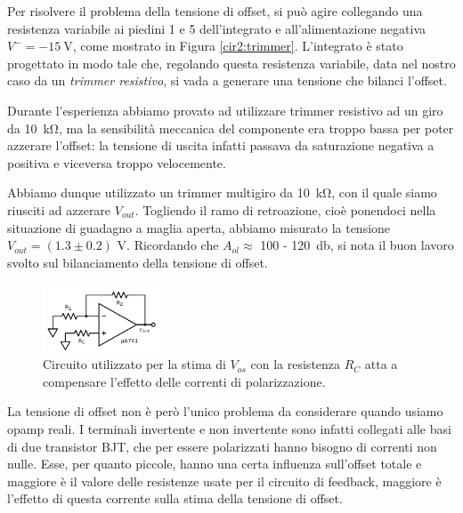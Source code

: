
Per risolvere il problema della tensione di offset, si può agire collegando una resistenza variabile ai piedini 1 e 5 dell'integrato e all'alimentazione negativa $V^- = \SI{-15}{\volt}$, come mostrato in Figura \ref{cir2:trimmer}.
L'integrato è stato progettato in modo tale che, regolando questa resistenza variabile, data nel nostro caso da un \textit{trimmer resistivo}, si vada a generare una tensione che bilanci l'offset.

Durante l'esperienza abbiamo provato ad utilizzare trimmer resistivo ad un giro da \SI{10}{\kilo\ohm}, ma la sensibilità meccanica del componente era troppo bassa per poter azzerare l'offset: la tensione di uscita infatti passava da saturazione negativa a positiva e viceversa troppo velocemente.

Abbiamo dunque utilizzato un trimmer multigiro da \SI{10}{\kilo\ohm}, con il quale siamo riusciti ad azzerare $V_{out}$.
Togliendo il ramo di retroazione, cioè ponendoci nella situazione di guadagno a maglia aperta, abbiamo misurato la tensione $V_{out}= (1.3\pm0.2)$ \si{\volt}.
Ricordando che $A_{ol} \approx$ 100 - \SI{120}{\decibel}, si nota il buon lavoro svolto sul bilanciamento della tensione di offset.

\begin{figure}
  \begin{center}
    \includegraphics[width=0.310\textwidth]{../E02/latex/current_correction.pdf}
  \end{center}
  \caption{Circuito utilizzato per la stima di $V_{os}$ con la resistenza $R_C$ atta a compensare l'effetto delle correnti di polarizzazione.}
  \label{cir2:current_correction}
\end{figure}

La tensione di offset non è però l'unico problema da considerare quando usiamo opamp reali.
I terminali invertente e non invertente sono infatti collegati alle basi di due transistor BJT, che per essere polarizzati hanno bisogno di correnti non nulle.
Esse, per quanto piccole, hanno una certa influenza sull'offset totale e maggiore è il valore delle resistenze usate per il circuito di feedback, maggiore è l'effetto di questa corrente sulla stima della tensione di offset.

